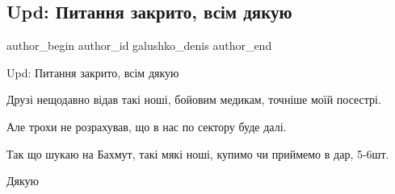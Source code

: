 
 
 
 
 

\subsection{Upd: Питання закрито, всім дякую}
\label{sec:14_12_2022.fb.galushko_denis.1.upd__pitannya_zakrit}

\ifcmt
 author_begin
   author_id galushko_denis
 author_end
\fi

Upd: Питання закрито, всім дякую🤝🇺🇦

Друзі нещодавно відав такі ноші, бойовим медикам, точніше моїй посестрі.

Але трохи не розрахував, що в нас по сектору буде далі.

Так що шукаю на  Бахмут, такі мякі ноші, купимо чи приймемо в дар, 5-6шт. 

Дякую
